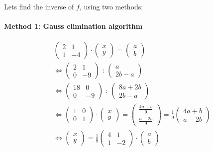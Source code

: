 \documentclass[notitlepage]{math}
\begin{document}
Lets find the inverse of $f$, using two methods: \\
\paragraph{Method 1: Gauss elimination algorithm}
\begin{align*}
    &\begin{pmatrix} 2 & 1 \\
            1 & -4
    \end{pmatrix} \cdot \begin{pmatrix} x \\ y \end{pmatrix} = \begin{pmatrix} a \\ b \end{pmatrix} \\
    &\Longleftrightarrow \begin{pmatrix} 2 & 1 \\
                 0 & -9 
    \end{pmatrix} \text{ : } \begin{pmatrix} a \\ 2b-a \end{pmatrix} \\
    &\Longleftrightarrow \begin{pmatrix} 18 & 0 \\
             0 & -9
    \end{pmatrix} \text{ : } \begin{pmatrix} 8a  + 2b\\ 2b-a \end{pmatrix} \\
    &\Longleftrightarrow \begin{pmatrix} 1 & 0 \\ 0 & 1 \end{pmatrix} \cdot \begin{pmatrix} x \\ y \end{pmatrix} 
    = \begin{pmatrix} \frac{4a + b}{9} \\ \frac{a-2b}{9} \end{pmatrix} = \frac{1}{9} \begin{pmatrix} 4a + b \\ a-2b \end{pmatrix} \\
    &\Longleftrightarrow \begin{pmatrix} x \\ y \end{pmatrix} = \frac{1}{9} \begin{pmatrix} 4& 1 \\ 1 & -2 \end{pmatrix} \cdot \begin{pmatrix} a \\ b \end{pmatrix} \\
\end{align*}
\end{document}

